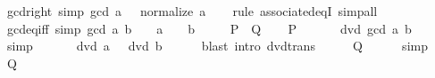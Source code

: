 \begin{isabellebody}
{\isafoldproof}%
%
\isadelimproof
\isanewline
%
\endisadelimproof
\isanewline
{}\isamarkupfalse%
\ gcd{\isacharunderscore}{\kern0pt}{}{\isacharunderscore}{\kern0pt}right\ {\isacharbrackleft}{\kern0pt}simp{\isacharbrackright}{\kern0pt}{\isacharcolon}{\kern0pt}\ {\isachardoublequoteopen}gcd\ a\ {}\ {\isacharequal}{\kern0pt}\ normalize\ a{\isachardoublequoteclose}\isanewline
%
\isadelimproof
\ \ %
\endisadelimproof
%
\isatagproof
{}\isamarkupfalse%
\ {\isacharparenleft}{\kern0pt}rule\ associated{\isacharunderscore}{\kern0pt}eqI{\isacharparenright}{\kern0pt}\ simp{\isacharunderscore}{\kern0pt}all%
\endisatagproof
{\isafoldproof}%
%
\isadelimproof
\isanewline
%
\endisadelimproof
\isanewline
{}\isamarkupfalse%
\ gcd{\isacharunderscore}{\kern0pt}eq{\isacharunderscore}{\kern0pt}{}{\isacharunderscore}{\kern0pt}iff\ {\isacharbrackleft}{\kern0pt}simp{\isacharbrackright}{\kern0pt}{\isacharcolon}{\kern0pt}\ {\isachardoublequoteopen}gcd\ a\ b\ {\isacharequal}{\kern0pt}\ {}\ {\isasymlongleftrightarrow}\ a\ {\isacharequal}{\kern0pt}\ {}\ {\isasymand}\ b\ {\isacharequal}{\kern0pt}\ {}{\isachardoublequoteclose}\isanewline
\ \ {\isacharparenleft}{\kern0pt}\ {\isachardoublequoteopen}{\isacharquery}{\kern0pt}P\ {\isasymlongleftrightarrow}\ {\isacharquery}{\kern0pt}Q{\isachardoublequoteclose}{\isacharparenright}{\kern0pt}\isanewline
%
\isadelimproof
%
\endisadelimproof
%
\isatagproof
{}\isamarkupfalse%
\isanewline
\ \ \isamarkupfalse%
\ {\isacharquery}{\kern0pt}P\isanewline
\ \ \isamarkupfalse%
\ \isamarkupfalse%
\ {\isachardoublequoteopen}{}\ dvd\ gcd\ a\ b{\isachardoublequoteclose}\isanewline
\ \ \ \ \isamarkupfalse%
\ simp\isanewline
\ \ \isamarkupfalse%
\ \isamarkupfalse%
\ {\isachardoublequoteopen}{}\ dvd\ a{\isachardoublequoteclose}\ \ {\isachardoublequoteopen}{}\ dvd\ b{\isachardoublequoteclose}\isanewline
\ \ \ \ \isamarkupfalse%
\ {\isacharparenleft}{\kern0pt}blast\ intro{\isacharcolon}{\kern0pt}\ dvd{\isacharunderscore}{\kern0pt}trans{\isacharparenright}{\kern0pt}{\isacharplus}{\kern0pt}\isanewline
\ \ \isamarkupfalse%
\ \isamarkupfalse%
\ {\isacharquery}{\kern0pt}Q\isanewline
\ \ \ \ \isamarkupfalse%
\ simp\isanewline
{}\isamarkupfalse%
\isanewline
\ \ \isamarkupfalse%
\ {\isacharquery}{\kern0pt}Q\isanewline

\end{isabellebody}

